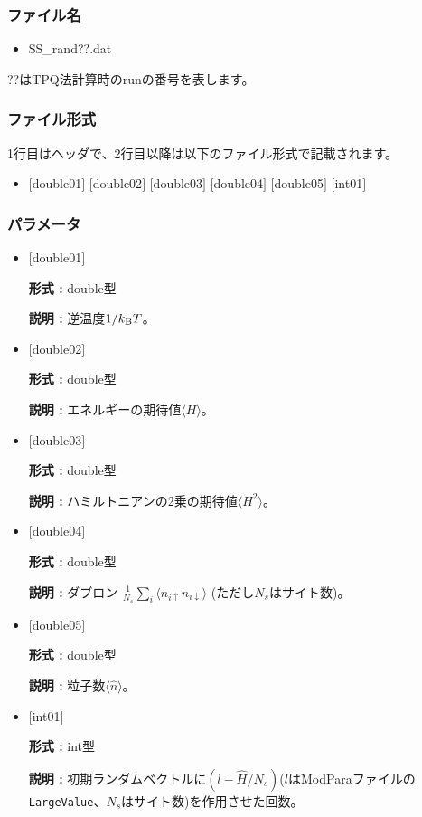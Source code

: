 \subsubsection{ファイル名}
 \begin{itemize}
   \item SS\_rand??.dat
  \end{itemize}
  ??はTPQ法計算時のrunの番号を表します。

\subsubsection{ファイル形式}
1行目はヘッダで、2行目以降は以下のファイル形式で記載されます。
 \begin{itemize}
   \item $[$double01$]$ $[$double02$]$ $[$double03$]$ $[$double04$]$ $[$double05$]$ $[$int01$]$
  \end{itemize}
\subsubsection{パラメータ}
 \begin{itemize}

  \item  $[$double01$]$
  
 {\bf 形式 :} double型

{\bf 説明 :} 逆温度$1/{k_{\rm B}T}$。
 
  \item $[$double02$]$

 {\bf 形式 :} double型 

{\bf 説明 :}  エネルギーの期待値$\langle H \rangle$。

  \item $[$double03$]$

 {\bf 形式 :} double型 

{\bf 説明 :} ハミルトニアンの2乗の期待値$\langle H^2 \rangle$。

  \item $[$double04$]$

 {\bf 形式 :} double型 

{\bf 説明 :} ダブロン
$\frac{1}{N_s} \sum_{i}\langle n_{i\uparrow}n_{i\downarrow}\rangle$ (ただし$N_s$はサイト数)。

  \item $[$double05$]$

 {\bf 形式 :} double型 

{\bf 説明 :} 粒子数$\langle {\hat n} \rangle$。


  \item $[$int01$]$

 {\bf 形式 :} int型 

{\bf 説明 :} 初期ランダムベクトルに$(l-\hat{H}/N_{s})$($l$はModParaファイルの\verb|LargeValue|、$N_{s}$はサイト数)を作用させた回数。

 \end{itemize}

